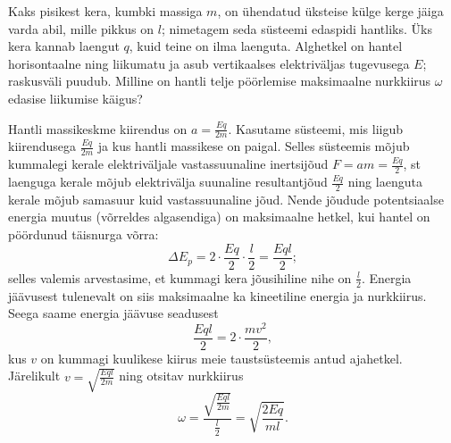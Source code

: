 
Kaks pisikest kera, kumbki massiga $m$, on ühendatud üksteise külge kerge jäiga varda abil, mille pikkus on $l$; nimetagem seda süsteemi edaspidi hantliks. Üks kera kannab laengut $q$, kuid teine on ilma laenguta. Alghetkel on hantel horisontaalne ning liikumatu ja asub vertikaalses elektriväljas tugevusega $E$; raskusväli puudub. Milline on hantli telje pöörlemise maksimaalne nurkkiirus $\omega$ edasise liikumise käigus?


\hint

\solu
Hantli massikeskme kiirendus on $a=\frac{Eq}{2m}$. Kasutame süsteemi, mis liigub kiirendusega $\frac{Eq}{2m}$ ja kus hantli massikese on paigal. Selles süsteemis mõjub kummalegi kerale elektriväljale vastassuunaline inertsijõud $F=am=\frac{Eq}{2}$, st laenguga kerale mõjub elektrivälja suunaline resultantjõud $\frac{Eq}{2}$ ning laenguta kerale mõjub samasuur kuid vastassuunaline jõud. Nende jõudude potentsiaalse energia muutus (võrreldes algasendiga) on maksimaalne hetkel, kui hantel on pöördunud täisnurga võrra: $$\Delta E_p=2\cdot \frac{Eq}2\cdot\frac l2=\frac{Eql}2;$$ selles valemis arvestasime, et kummagi kera jõusihiline nihe on $\frac l 2$. Energia jäävusest tulenevalt on siis maksimaalne ka kineetiline energia ja nurkkiirus.  Seega saame energia jäävuse seadusest $$\frac{Eql}2=2\cdot \frac{mv^2}2,$$ kus $v$ on kummagi kuulikese kiirus meie taustsüsteemis antud ajahetkel. Järelikult $v=\sqrt{\frac{Eql}{2m}}$ ning otsitav nurkkiirus $$\omega=\frac{\sqrt{\frac{Eql}{2m}}}{\frac{l}{2}}=\sqrt{\frac{2Eq}{ml}}.$$
\probend